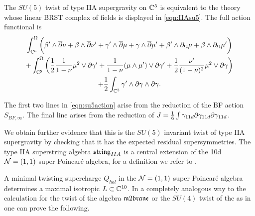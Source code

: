 \begin{conj}
\label{conj:IIAsu5}
The $SU(5)$ twist of type IIA supergravity on $\mathbb C^5$ is equivalent to the theory whose linear BRST complex of fields is displayed in \eqref{eqn:IIAsu5}. 
The full action functional is 
\begin{multline}
\label{eqn:su5action}
\int^\Omega_{\mathbb C^5}\bigg(\beta' \wedge \overline{\partial} \nu + \beta \wedge \overline{\partial} \nu' + \gamma' \wedge \overline{\partial} \mu + \gamma \wedge \overline{\partial} \mu' +  \beta' \wedge \partial_{\Omega} \mu + \beta \wedge \partial_{\Omega} \mu' \bigg) \\
+ \int^\Omega_{\mathbb C^5} \bigg( \frac12 \frac{1}{1-\nu} \mu^2 \vee \partial \gamma' +  \frac{1}{1-\nu} (\mu \wedge \mu') \vee \partial \gamma' + \frac12 \frac{\nu'}{(1-\nu)^2} \mu^2 \vee \partial \gamma \bigg) \\
+ \frac12 \int_{\mathbb C^5} \gamma' \wedge \partial \gamma \wedge \partial \gamma .
\end{multline} 
\end{conj} 

The first two lines in \eqref{eqn:su5action} arise from the reduction of the BF action $S_{BF,\infty}$. 
The final line arises from the reduction of $J = \frac16 \int \gamma_{11d} \partial \gamma_{11d} \partial \gamma_{11d}$. 

\parsec[]


We obtain further evidence that this is the $SU(5)$ invariant twist of type IIA supergravity by checking that it has the expected residual supersymmetries. 
The type IIA superstring algebra $\mathfrak{string}_{IIA}$ is a central extension of the 10d $\mathcal N=(1,1)$ super Poincar\'e algebra, for a definition we refer to \cite{BH,FSS}. 

A minimal twisting supercharge $Q_{hol}$ in the $\mathcal N=(1,1)$ super Poincar\'e algebra determines a maximal isotropic $L \subset \mathbb C^{10}$. 
In a completely analogous way to the calculation for the twist of the algebra $\m2$ or the $SU(4)$ twist of the as in \cite{CLsugra} one can prove the following. 

